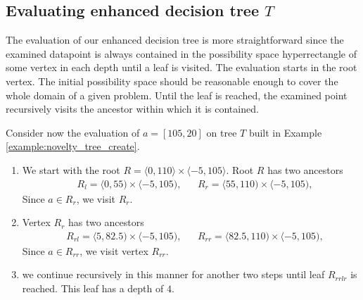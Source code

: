 \subsection{Evaluating enhanced decision tree $T$}
The evaluation of our enhanced decision tree is more straightforward since the examined datapoint is always contained in the possibility space hyperrectangle of some vertex in each depth until a leaf is visited.
The evaluation starts in the root vertex. The initial possibility space should be reasonable enough to cover the whole domain of a given problem.
Until the leaf is reached, the examined point recursively visits the ancestor within which it is contained.



\begin{example}
\label{ex:regular_point_evaluation_novelty}
    Consider now the evaluation of $a = [105,20]$ on tree $T$ built in Example \ref{example:novelty_tree_create}.

\begin{enumerate}
    \item  We start with the root $R = \langle 0,110\rangle \times \langle -5, 105 \rangle$.
    Root $R$ has two ancestors 
\begin{align*}
    &R_l = \langle 0,55) \times \langle -5, 105),&
    &R_r = \langle 55,110) \times \langle -5, 105),
\end{align*}
Since $a \in R_r$, we visit $R_r$.
\item Vertex $R_r$ has two ancestors
\begin{align*}
    &R_{rl} = \langle 5,82.5) \times \langle -5, 105),&
    &R_{rr} = \langle 82.5,110) \times \langle -5, 105),
\end{align*}
Since $a \in R_{rr}$, we visit vertex $R_{rr}$.
\item
we continue recursively in this manner for another two steps until leaf $R_{rrlr}$ is reached. This leaf has a depth of $4$.

\end{enumerate}
   
\end{example}

